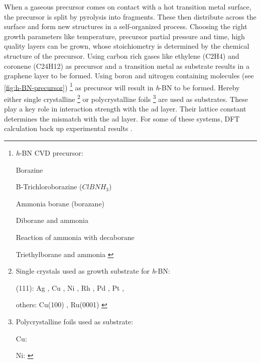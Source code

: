 When a gaseous precursor comes on contact with a hot transition metal surface, the precursor is split by pyrolysis into fragments. These then distribute across the surface and form new structures in a self-organized process. Choosing the right growth parameters like temperature, precursor partial pressure and time, high quality layers can be grown, whose stoichiometry is determined by the chemical structure of the precursor. Using carbon rich gases like ethylene (C2H4) \cite{ndiaye_structure_2008-1, coraux_growth_2009} and coronene (C24H12) \cite{coraux_growth_2009} as precursor and a transition metal as substrate results in a graphene layer to be formed. Using boron and nitrogen containing molecules (see \autoref{fig:h-BN-precursor})
\footnote{\textit{h}-BN CVD precursor:
	
	Borazine \cite{muller_epitaxial_2010, joshi_boron_2012, schwarz_corrugation_2017, li_grain_2015, preobrajenski_monolayer_2005, auwarter_xpd_1999, morscher_formation_2006, preobrajenski_monolayer_2007-1, corso_boron_2004, goriachko_self-assembly_2007, kidambi_situ_2014, kim_synthesis_2012}
	
	B-Trichloroborazine (${ClBNH}_3$) \cite{auwarter_synthesis_2004-1, muller_symmetry_2005}
	
	Ammonia borane (borazane) \cite{guo_controllable_2012-4, lee_large-scale_2012, kim_synthesis_2012-1} 
	
	Diborane and ammonia \cite{ismach_toward_2012}
	
	Reaction of ammonia with decaborane \cite{chatterjee_chemical_2011}
	
	Triethylborane and ammonia \cite{siegel_heterogeneous_2017}
} 
as precursor will result in \textit{h}-BN to be formed. Hereby either single crystalline \footnote{Single crystals used as growth substrate for \textit{h}-BN:
	
	(111):
	Ag \cite{muller_epitaxial_2010}, 
	Cu \cite{joshi_boron_2012, schwarz_corrugation_2017, li_grain_2015, preobrajenski_monolayer_2005,siegel_heterogeneous_2017}, 
	Ni \cite{preobrajenski_monolayer_2005, nagashima_electronic_1995, auwarter_synthesis_2004-1, auwarter_xpd_1999}, 
	Rh \cite{preobrajenski_monolayer_2007-1, corso_boron_2004},
	Pd \cite{nagashima_electronic_1995, morscher_formation_2006}, 
	Pt \cite{nagashima_electronic_1995, preobrajenski_monolayer_2007-1, muller_symmetry_2005}, 
	
	others:
	Cu(100) \cite{guo_controllable_2012-4}, 
	Ru(0001) \cite{goriachko_self-assembly_2007, preobrajenski_monolayer_2007-1}
}
or polycrystalline foils \footnote{Polycrystalline foils used as substrate:
	
	Cu: \cite{kidambi_situ_2014, lee_large-scale_2012, kim_synthesis_2012, kim_synthesis_2012-1, ismach_toward_2012, guo_controllable_2012-4, chatterjee_chemical_2011}
	
	Ni: \cite{ismach_toward_2012, chatterjee_chemical_2011}
}
are used as substrates. These play a key role in interaction strength with the ad layer. Their lattice constant determines the mismatch with the ad layer. For some of these systems, DFT calculation back up experimental results \cite{gomez_diaz_hexagonal_2013}.


